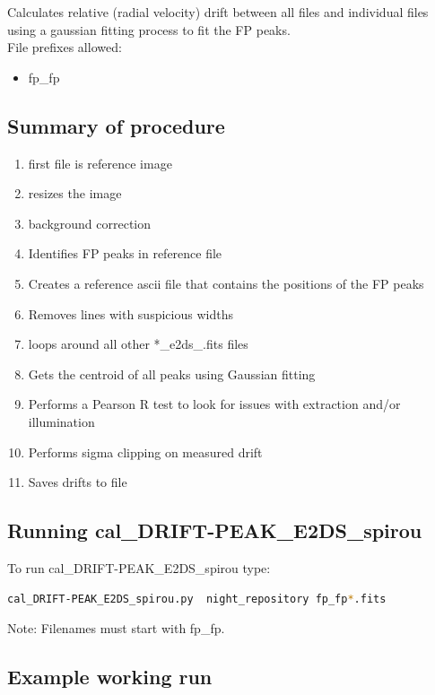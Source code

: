 Calculates relative (radial velocity) drift between all files and individual files using a gaussian fitting process to fit the FP peaks. \\


\noindent File prefixes allowed:
\begin{itemize}
	\item fp\_fp
\end{itemize}

\subsection{Summary of procedure}
\begin{enumerate}
	\item first file is reference image
	\item resizes the image
	\item background correction
	\item Identifies FP peaks in reference file
	\item Creates a reference ascii file that contains the positions of the FP peaks
	\item Removes lines with suspicious widths
	\item loops around all other *\_e2ds\_.fits files
	\item Gets the centroid of all peaks using Gaussian fitting
	\item Performs a Pearson R test to look for issues with extraction and/or illumination
	\item Performs sigma clipping on measured drift
	\item Saves drifts to file
\end{enumerate}

\subsection{Running cal\_DRIFT-PEAK\_E2DS\_spirou}

To run cal\_DRIFT-PEAK\_E2DS\_spirou type:
\begin{lstlisting}[language=bash, style=bashstyle]
cal_DRIFT-PEAK_E2DS_spirou.py  night_repository fp_fp*.fits
\end{lstlisting}

\noindent Note: Filenames must start with fp\_fp.

\subsection{Example working run}

